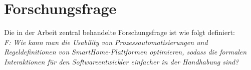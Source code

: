 \section{Forschungsfrage}
\label{sec:forschungsfragen}
    Die in der Arbeit zentral behandelte Forschungsfrage ist wie folgt definiert: 
    \\
    \linebreak 
    \textit{F: Wie kann man die Usability von Prozessautomatisierungen und Regeldefinitionen von SmartHome-Plattformen optimieren, sodass die formalen Interaktionen für den Softwareentwickler einfacher in der Handhabung sind?}


